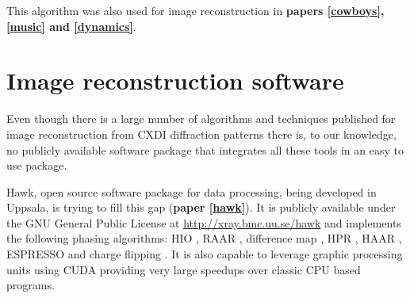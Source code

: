 This algorithm was also used for image reconstruction in {\bf papers
\ref{cowboys},\ref{music} and \ref{dynamics}}.

\section{Image reconstruction software}

Even though there is a large number of algorithms and techniques published for
image reconstruction from CXDI diffraction patterns there is, to our knowledge, no publicly available
software package that integrates all these tools in an easy to use package.

Hawk, open source software package for data processing, being developed in Uppsala, is trying to fill
this gap ({\bf paper \ref{hawk}}). It is publicly available under the GNU General Public License at
\url{http://xray.bmc.uu.se/hawk}  and implements the following phasing algorithms:
 HIO \cite{Fienup1982Phase}, RAAR \cite{Luke2005Relaxed}, difference map
 \cite{Elser2003Phase}, HPR \cite{Bauschke2003Hybrid}, HAAR \cite{Bauschke2006Strongly}, ESPRESSO
\cite{Marchesini2008Ab} and charge flipping
\cite{Oszlanyi2004Ab,Oszlanyi2005It}. It is also
capable to leverage graphic processing units using CUDA providing very large speedups over classic
CPU based programs.

